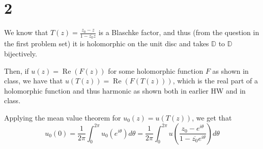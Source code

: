 \documentclass[12pt,letterpaper]{article}
\theoremstyle{definition}
\newcommand{\D}{\mathbb{D}}
\DeclareMathOperator{\real}{Re}
\begin{document}
\section*{2}

We know that $T(z) = \frac{z_{0} - z}{1-\overline{z_{0}}z}$ is a Blaschke factor, and thus (from the question in the first problem set) it is holomorphic on the unit disc and takes $\D$ to $\D$ bijectively.

Then, if $u(z) = \real(F(z))$ for some holomorphic function $F$ as shown in class, we have that $u(T(z)) = \real(F(T(z)))$, which is the real part of a holomorphic function and thus harmonic as shown both in earlier HW and in class.

Applying the mean value theorem for $u_{0}(z) = u(T(z))$, we get that
\[
  u_{0}(0) = \frac{1}{2\pi}\int_{0}^{2\pi}u_{0}(e^{i\theta})d\theta = \frac{1}{2\pi}\int_{0}^{2\pi}u\left(\frac{z_{0}-e^{i\theta}}{1-\overline{z_{0}}e^{i\theta}}\right)d\theta
\]
\end{document}
